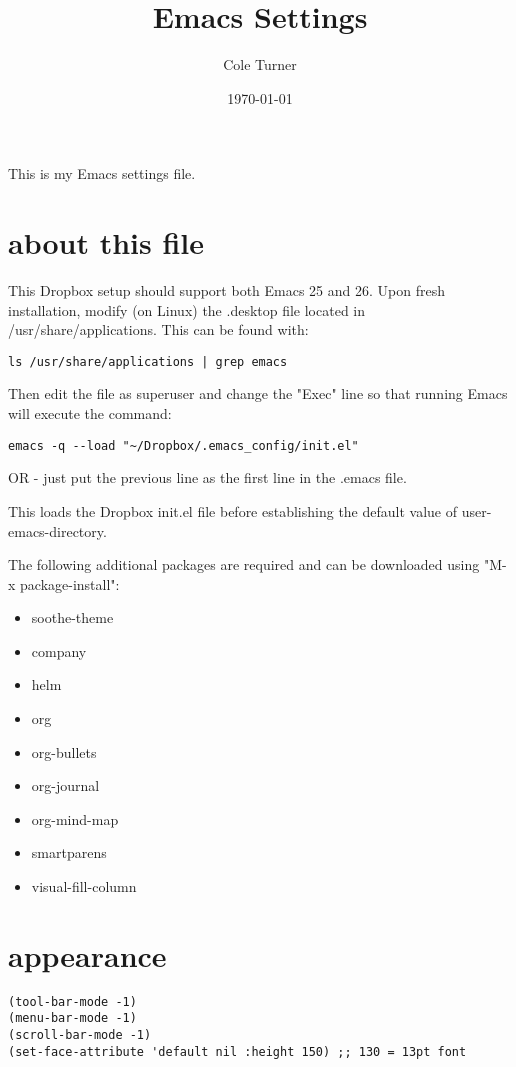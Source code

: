 \documentclass[11pt]{article}
\author{Cole Turner}
\date{\today}
\title{Emacs Settings}
\begin{document}
\maketitle
\tableofcontents

This is my Emacs settings file.

\section{about this file}
\label{sec:org8e5129f}
This Dropbox setup should support both Emacs 25 and 26. Upon fresh installation, modify (on Linux) the .desktop file located in /usr/share/applications. This can be found with:

\begin{verbatim}
ls /usr/share/applications | grep emacs
\end{verbatim}

Then edit the file as superuser and change the "Exec" line so that running Emacs will execute the command:

\begin{verbatim}
emacs -q --load "~/Dropbox/.emacs_config/init.el"
\end{verbatim}

OR - just put the previous line as the first line in the .emacs file.

This loads the Dropbox init.el file before establishing the default value of user-emacs-directory.

The following additional packages are required and can be downloaded using "M-x package-install":    
\begin{itemize}
\item soothe-theme
\item company
\item helm
\item org
\item org-bullets
\item org-journal
\item org-mind-map
\item smartparens
\item visual-fill-column
\end{itemize}

\section{appearance}
\label{sec:org2d3118c}
\begin{verbatim}
(tool-bar-mode -1)
(menu-bar-mode -1)
(scroll-bar-mode -1)
(set-face-attribute 'default nil :height 150) ;; 130 = 13pt font
\end{verbatim}
\end{document}
